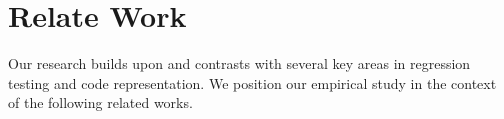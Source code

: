 \section{Relate Work}









Our research builds upon and contrasts with several key areas in regression testing and code representation. We position our empirical study in the context of the following related works.

